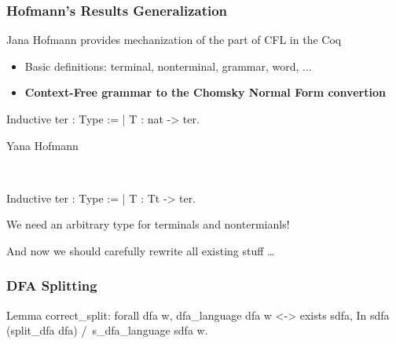 \documentclass[xcolor=table]{beamer}
\begin{document}
\begin{frame}[fragile] \frametitle{Hofmann's Results Generalization}

Jana Hofmann provides mechanization of the part of CFL in the Coq
\begin{itemize}
    \item Basic definitions: terminal, nonterminal, grammar, word, $\dots$
    \pause
    \item \textbf{Context-Free grammar to the Chomsky Normal Form convertion}
\end{itemize}
\pause

\begin{center}
  \begin{minipage}[t]{0.47\textwidth}
\begin{center}
    \begin{pyglist}[language=coq, numbers=none, numbersep=5pt]
    Inductive ter : Type :=
     | T : nat -> ter.
  	\end{pyglist}

    Yana Hofmann
  \end{center}
  \end{minipage}
  ~ \vline \vline ~
  \begin{minipage}[t]{0.47\textwidth}
\begin{center}
    \begin{pyglist}[language=coq, numbers=none, numbersep=5pt]
    Inductive ter : Type :=
     | T : Tt -> ter.
    \end{pyglist}

    We need an arbitrary type for terminals and nontermianls!
  \end{center}
  \end{minipage}

\pause
\vspace{0.5cm}
And now we should carefully rewrite all existing stuff \dots
\end{center}


\end{frame}


\begin{frame}[fragile] \frametitle{DFA Splitting}
\begin{pyglist}[language=coq, numbers=none, numbersep=5pt]
Lemma correct_split:
   forall dfa w,
     dfa_language dfa w <->
     exists sdfa,
        In sdfa (split_dfa dfa) /\ s_dfa_language sdfa w.
\end{pyglist}
\end{frame}
\end{document}
